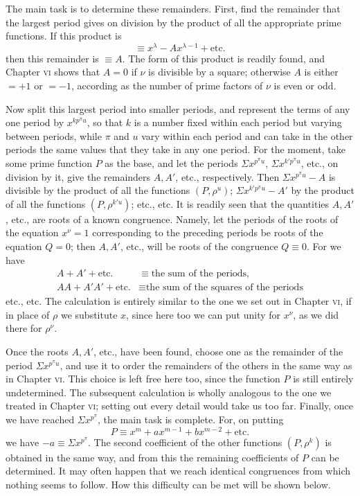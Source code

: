 The main task is to determine these remainders. First, find the remainder that the largest period gives on division by the product of all the appropriate prime functions. If this product is
\[
\equiv x^\lambda-Ax^{\lambda-1}+\text{etc.}
\]
then this remainder is $\equiv A$. The form of this product is readily found, and Chapter \textsc{vi} shows that $A=0$ if $\nu$ is divisible by a square; otherwise $A$ is either $=+1$ or $=-1$, according as the number of prime factors of $\nu$ is even or odd.

Now split this largest period into smaller periods, and represent the terms of any one period by $x^{kp^\pi u}$, so that $k$ is a number
fixed within each period but varying between periods, while $\pi$ and $u$ vary within each period and can take in the other periods the same values that they take in any one period. For the moment, take some prime function $P$ as the base, and let the periods $\Sigma x^{p^\pi u}$, $\Sigma x^{k'p^\pi u}$, etc., on division by it, give the remainders $A,A'$, etc., respectively. Then $\Sigma x^{p^\pi u}-A$ is divisible by the product of all the functions $(P,\rho^u)$; $\Sigma x^{k'p^\pi u}-A'$ by the product of all the functions $(P,\rho^{k'u})$; etc., etc. It is readily seen that the quantities $A,A'$, etc., are roots of a known congruence. Namely, let the periods of the roots of the equation $x^\nu=1$ corresponding to the preceding periods be roots of the equation $Q=0$; then $A,A'$, etc., will be roots of the congruence $Q\equiv0$. For we have
\[
\begin{aligned}
A+A'+\text{etc.}&\equiv\text{the sum of the periods},\\
AA+A'A'+\text{etc.}&\equiv\text{the sum of the squares of the periods}
\end{aligned}
\]
etc., etc. The calculation is entirely similar to the one we set out in Chapter \textsc{vi}, if in place of $\rho$ we substitute $x$, since here too we can put unity for $x^\nu$, as we did there for $\rho^\nu$.

Once the roots $A,A'$, etc., have been found, choose one as the remainder of the period $\Sigma x^{p^\pi u}$, and use it to order the remainders of the others in the same way as in Chapter \textsc{vi}. This choice is left free here too, since the function $P$ is still entirely undetermined. The subsequent calculation is wholly analogous to the one we treated in Chapter \textsc{vi}; setting out every detail would take us too far. Finally, once we have reached $\Sigma x^{p^\pi}$, the main task is complete. For, on putting
\[
P\equiv x^m+ax^{m-1}+bx^{m-2}+\text{etc.}
\]
we have $-a\equiv\Sigma x^{p^\pi}$. The second coefficient of the other functions $(P,\rho^k)$ is obtained in the same way, and from this the remaining coefficients of $P$ can be determined. It may often happen that we reach identical congruences from which nothing seems to follow. How this difficulty can be met will be shown below.

